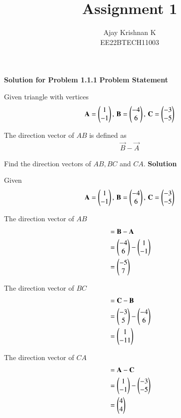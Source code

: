 \documentclass[journal,11pt]{IEEEtran}
\begin{document}
\vspace{3cm}
\author{Ajay Krishnan K\\EE22BTECH11003}

\title{Assignment 1}
\maketitle

\textbf{Solution for Problem 1.1.1}
\bigbreak
\textbf{Problem Statement}

Given triangle with vertices
\begin{align}
    \label{eq:tri-pts}
    \mathbf{A} = \begin{pmatrix} 1 \\ -1 \end{pmatrix},\,
    \mathbf{B} = \begin{pmatrix}-4 \\ 6\end{pmatrix},\,
    \mathbf{C} = \begin{pmatrix}-3 \\ -5\end{pmatrix}
\end{align}

The direction vector of $AB$ is defined as
\begin{align}
    \vec{B}-
    \vec{A}
\end{align}

Find the direction vectors of $AB, BC$ and $CA$.
\bigbreak
\textbf{Solution}

Given
\begin{align}
    \mathbf{A} = \begin{pmatrix}1  \\ -1\end{pmatrix},\,
    \mathbf{B} = \begin{pmatrix}-4 \\ 6\end{pmatrix},\,
    \mathbf{C} = \begin{pmatrix}-3 \\ -5\end{pmatrix}
\end{align}

The direction vector of $AB$
\begin{align}
     & = \mathbf{B} - \mathbf{A} \\
     & = \begin{pmatrix}-4 \\ 6\end{pmatrix} - \begin{pmatrix}1 \\ -1\end{pmatrix} \\
     & = \begin{pmatrix}-5 \\ 7\end{pmatrix}
\end{align}

The direction vector of $BC$
\begin{align}
     & = \mathbf{C} - \mathbf{B} \\
     & = \begin{pmatrix}-3 \\ 5\end{pmatrix} - \begin{pmatrix}-4 \\ 6\end{pmatrix} \\
     & = \begin{pmatrix}1  \\ -11\end{pmatrix}
\end{align}

The direction vector of $CA$
\begin{align}
     & = \mathbf{A} - \mathbf{C} \\
     & = \begin{pmatrix}1 \\ -1\end{pmatrix} - \begin{pmatrix}-3 \\ -5\end{pmatrix} \\
     & = \begin{pmatrix} 4 \\ 4 \end{pmatrix}
\end{align}
\end{document}
